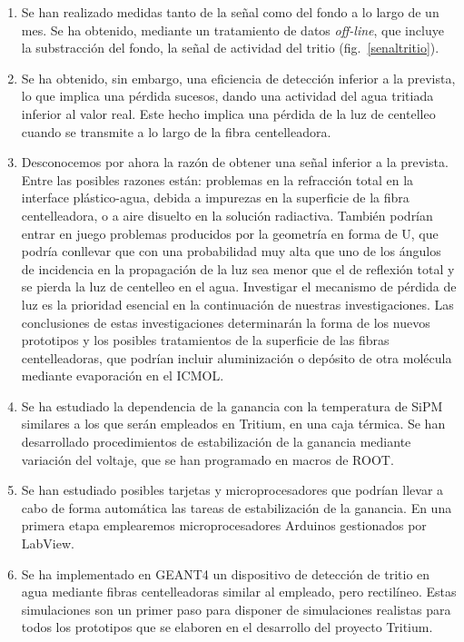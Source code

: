 \begin{enumerate}
\item Se han realizado medidas tanto de la señal como del fondo a lo largo de un mes. Se ha obtenido, mediante un tratamiento de datos \textit{off-line}, que incluye la substracción del fondo, la señal de actividad del tritio (fig.~\ref{senaltritio}). 

\item Se ha obtenido, sin embargo, una eficiencia de detección inferior a  la prevista,  lo que implica una pérdida sucesos, dando una  actividad del agua tritiada  inferior al valor real. Este hecho implica una pérdida de la luz de centelleo cuando se transmite a lo largo de  la fibra centelleadora.

\item Desconocemos por ahora la razón de obtener una señal inferior a la prevista. Entre las posibles razones están: problemas en la refracción total en la interface plástico-agua, debida a impurezas en la superficie de la fibra centelleadora, o a aire disuelto en la solución radiactiva. También podrían entrar en juego   problemas producidos por  la geometría en forma de U, que podría conllevar que con una probabilidad muy alta  que uno de los  ángulos de incidencia en la propagación de la luz sea menor que el de reflexión total y se pierda la luz de centelleo en el agua.  Investigar el mecanismo de pérdida de luz es la prioridad esencial en la continuación de nuestras investigaciones. Las conclusiones de estas investigaciones determinarán la forma de los nuevos prototipos y los posibles tratamientos de la superficie de las fibras centelleadoras, que podrían incluir aluminización o depósito de otra molécula mediante evaporación en el ICMOL.

\item Se ha estudiado la dependencia de la ganancia con la temperatura de  SiPM similares a los que serán empleados en Tritium, en una caja térmica. Se han desarrollado procedimientos de estabilización de la ganancia mediante variación del voltaje, que se han programado en macros de ROOT.

\item Se han estudiado posibles tarjetas y microprocesadores que podrían llevar a cabo de forma automática las tareas de estabilización de la ganancia. En una primera etapa emplearemos  microprocesadores Arduinos gestionados por LabView. 

\item Se ha implementado en GEANT4 un dispositivo de detección de tritio en agua mediante fibras centelleadoras similar al empleado, pero rectilíneo.  Estas simulaciones son un primer paso para disponer de simulaciones realistas para todos los prototipos que se elaboren en el desarrollo del proyecto Tritium.




\end{enumerate}
